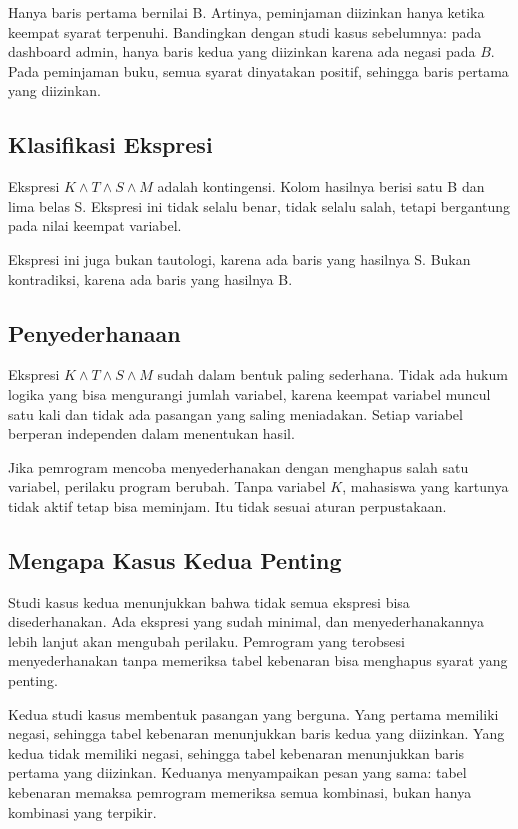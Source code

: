 \documentclass[11pt,a4paper]{article}
\begin{document}
Hanya baris pertama bernilai B. Artinya, peminjaman diizinkan hanya ketika keempat syarat terpenuhi. Bandingkan dengan studi kasus sebelumnya: pada dashboard admin, hanya baris kedua yang diizinkan karena ada negasi pada $B$. Pada peminjaman buku, semua syarat dinyatakan positif, sehingga baris pertama yang diizinkan.

\subsection{Klasifikasi Ekspresi}

Ekspresi $K \wedge T \wedge S \wedge M$ adalah kontingensi. Kolom hasilnya berisi satu B dan lima belas S. Ekspresi ini tidak selalu benar, tidak selalu salah, tetapi bergantung pada nilai keempat variabel.

Ekspresi ini juga bukan tautologi, karena ada baris yang hasilnya S. Bukan kontradiksi, karena ada baris yang hasilnya B.

\subsection{Penyederhanaan}

Ekspresi $K \wedge T \wedge S \wedge M$ sudah dalam bentuk paling sederhana. Tidak ada hukum logika yang bisa mengurangi jumlah variabel, karena keempat variabel muncul satu kali dan tidak ada pasangan yang saling meniadakan. Setiap variabel berperan independen dalam menentukan hasil.

Jika pemrogram mencoba menyederhanakan dengan menghapus salah satu variabel, perilaku program berubah. Tanpa variabel $K$, mahasiswa yang kartunya tidak aktif tetap bisa meminjam. Itu tidak sesuai aturan perpustakaan.

\subsection{Mengapa Kasus Kedua Penting}

Studi kasus kedua menunjukkan bahwa tidak semua ekspresi bisa disederhanakan. Ada ekspresi yang sudah minimal, dan menyederhanakannya lebih lanjut akan mengubah perilaku. Pemrogram yang terobsesi menyederhanakan tanpa memeriksa tabel kebenaran bisa menghapus syarat yang penting.

Kedua studi kasus membentuk pasangan yang berguna. Yang pertama memiliki negasi, sehingga tabel kebenaran menunjukkan baris kedua yang diizinkan. Yang kedua tidak memiliki negasi, sehingga tabel kebenaran menunjukkan baris pertama yang diizinkan. Keduanya menyampaikan pesan yang sama: tabel kebenaran memaksa pemrogram memeriksa semua kombinasi, bukan hanya kombinasi yang terpikir.
\end{document}
